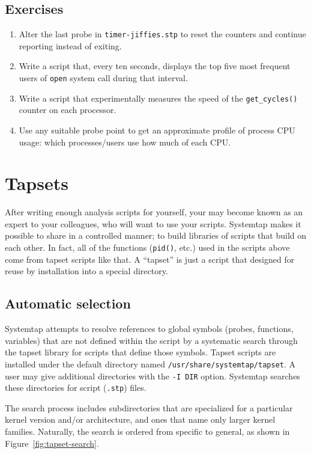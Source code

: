 \documentclass{article}
\renewcommand{\nomenclature}[2]{}
\begin{document}
\subsection{Exercises}
\begin{enumerate}
\item Alter the last probe in \verb+timer-jiffies.stp+ to reset the
counters and continue reporting instead of exiting.

\item Write a script that, every ten seconds, displays the top five
most frequent users of \verb+open+ system call during that interval.

\item Write a script that experimentally measures the speed of the
\verb+get_cycles()+ counter on each processor.

\item Use any suitable probe point to get an approximate profile of
process CPU usage: which processes/users use how much of each CPU.
\end{enumerate}

\section{Tapsets}

After writing enough analysis scripts for yourself, your may become
known as an expert to your colleagues, who will want to use your
scripts.  Systemtap makes it possible to share in a controlled manner;
to build libraries of scripts that build on each other.  In fact, all
of the functions (\verb+pid()+, etc.) used in the scripts above come
from tapset scripts like that.  A ``tapset'' is just a script that
designed for reuse by installation into a special directory.

\subsection{Automatic selection}

Systemtap attempts to resolve references to global symbols (probes,
functions, variables) that are not defined within the script by a
systematic search through the tapset library for scripts that define
those symbols.  Tapset scripts are installed under the default
directory named \verb+/usr/share/systemtap/tapset+.  A user may give
additional directories with the \verb+-I DIR+ option.  Systemtap
searches these directories for script (\verb+.stp+) files.

The search process includes subdirectories that are specialized for a
particular kernel version and/or architecture, and ones that name only
larger kernel families.  Naturally, the search is ordered from
specific to general, as shown in Figure~\ref{fig:tapset-search}.
\nomenclature{tapset search path}{A list of subdirectories searched by
systemtap for tapset scripts, allowing specialization by version
architecture.}
\end{document}
